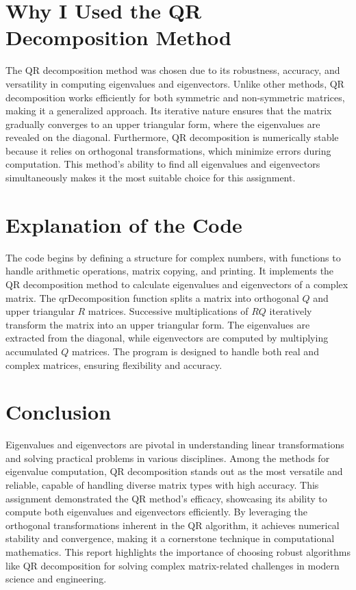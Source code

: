 \documentclass[12pt,a4paper]{article}
\begin{document}
\section*{Why I Used the QR Decomposition Method}
The QR decomposition method was chosen due to its robustness, accuracy, and versatility in computing eigenvalues and eigenvectors. Unlike other methods, QR decomposition works efficiently for both symmetric and non-symmetric matrices, making it a generalized approach. Its iterative nature ensures that the matrix gradually converges to an upper triangular form, where the eigenvalues are revealed on the diagonal. Furthermore, QR decomposition is numerically stable because it relies on orthogonal transformations, which minimize errors during computation. This method's ability to find all eigenvalues and eigenvectors simultaneously makes it the most suitable choice for this assignment.

\section*{Explanation of the Code}
The code begins by defining a structure for complex numbers, with functions to handle arithmetic operations, matrix copying, and printing. It implements the QR decomposition method to calculate eigenvalues and eigenvectors of a complex matrix. The qrDecomposition function splits a matrix into orthogonal \( Q \) and upper triangular \( R \) matrices. Successive multiplications of \( RQ \) iteratively transform the matrix into an upper triangular form. The eigenvalues are extracted from the diagonal, while eigenvectors are computed by multiplying accumulated \( Q \) matrices. The program is designed to handle both real and complex matrices, ensuring flexibility and accuracy.

\section*{Conclusion}
Eigenvalues and eigenvectors are pivotal in understanding linear transformations and solving practical problems in various disciplines. Among the methods for eigenvalue computation, QR decomposition stands out as the most versatile and reliable, capable of handling diverse matrix types with high accuracy. This assignment demonstrated the QR method's efficacy, showcasing its ability to compute both eigenvalues and eigenvectors efficiently. By leveraging the orthogonal transformations inherent in the QR algorithm, it achieves numerical stability and convergence, making it a cornerstone technique in computational mathematics. This report highlights the importance of choosing robust algorithms like QR decomposition for solving complex matrix-related challenges in modern science and engineering.
\end{document}
